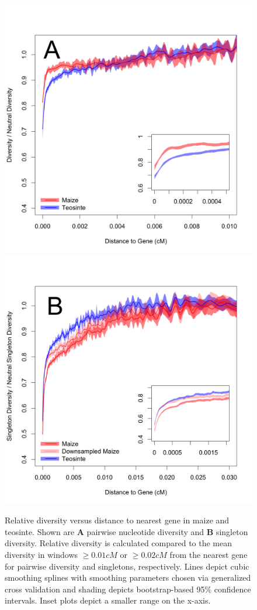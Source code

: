 \documentclass{pnastwo}
\begin{document}
\begin{article}
\begin{figure}
\centering
\includegraphics[width=.45\textwidth]{FigsAndFiles/distanceToGene_WithSignificance_Folded2_manuscript.png} \includegraphics[width=.45\textwidth]{FigsAndFiles/distanceToGene_WithSignificance_Singletons_Downsampled_threeLines_manuscript.png}
\caption{Relative diversity versus distance to nearest gene in maize and teosinte. 
Shown are \textbf{A} pairwise nucleotide diversity and \textbf{B} singleton diversity.  
Relative diversity is calculated compared to the mean diversity in windows $\geq 0.01 cM$ or $\geq 0.02 cM$ from the nearest
gene for pairwise diversity and singletons, respectively. 
  Lines depict cubic smoothing splines with smoothing parameters chosen via generalized cross validation and shading depicts bootstrap-based 95\% confidence intervals.
  Inset plots depict a smaller range on the x-axis. \label{fig:purify}
  }
\end{figure}


\end{article}
\end{document}
